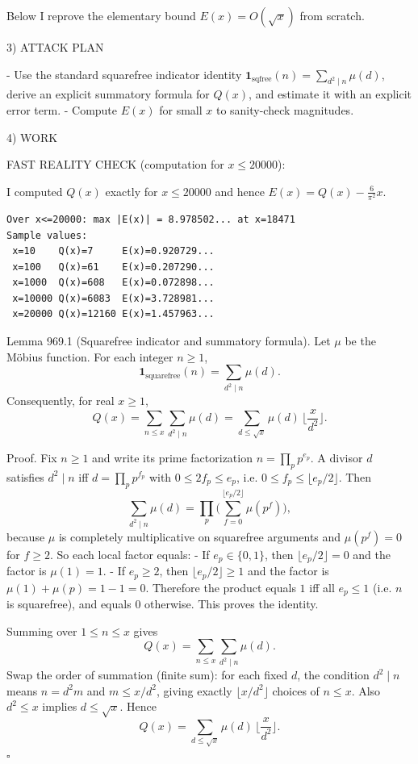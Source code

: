 Below I reprove the elementary bound $E(x)=O(\sqrt x)$ from scratch.

3) ATTACK PLAN

- Use the standard squarefree indicator identity $\mathbf 1_{\text{sqfree}}(n)=\sum_{d^2\mid n}\mu(d)$, derive an explicit summatory formula for $Q(x)$, and estimate it with an explicit error term.
- Compute $E(x)$ for small $x$ to sanity-check magnitudes.

4) WORK

FAST REALITY CHECK (computation for $x\le 20000$):

I computed $Q(x)$ exactly for $x\le 20000$ and hence $E(x)=Q(x)-\frac{6}{\pi^2}x$.

\begin{verbatim}
Over x<=20000: max |E(x)| = 8.978502... at x=18471
Sample values:
 x=10    Q(x)=7     E(x)=0.920729...
 x=100   Q(x)=61    E(x)=0.207290...
 x=1000  Q(x)=608   E(x)=0.072898...
 x=10000 Q(x)=6083  E(x)=3.728981...
 x=20000 Q(x)=12160 E(x)=1.457963...
\end{verbatim}

Lemma 969.1 (Squarefree indicator and summatory formula).
Let $\mu$ be the M\"obius function. For each integer $n\ge 1$,
\[
\mathbf 1_{\text{squarefree}}(n)=\sum_{d^2\mid n} \mu(d).
\]
Consequently, for real $x\ge 1$,
\[
Q(x)=\sum_{n\le x} \sum_{d^2\mid n}\mu(d) = \sum_{d\le \sqrt x} \mu(d)\,\Big\lfloor\frac{x}{d^2}\Big\rfloor.
\]

Proof.
Fix $n\ge 1$ and write its prime factorization $n=\prod_p p^{e_p}$.
A divisor $d$ satisfies $d^2\mid n$ iff $d=\prod_p p^{f_p}$ with $0\le 2f_p\le e_p$, i.e. $0\le f_p\le \lfloor e_p/2\rfloor$.
Then
\[
\sum_{d^2\mid n}\mu(d) = \prod_p \Big(\sum_{f=0}^{\lfloor e_p/2\rfloor} \mu(p^f)\Big),
\]
because $\mu$ is completely multiplicative on squarefree arguments and $\mu(p^f)=0$ for $f\ge 2$.
So each local factor equals:
- If $e_p\in\{0,1\}$, then $\lfloor e_p/2\rfloor=0$ and the factor is $\mu(1)=1$.
- If $e_p\ge 2$, then $\lfloor e_p/2\rfloor\ge 1$ and the factor is $\mu(1)+\mu(p)=1-1=0$.
Therefore the product equals $1$ iff all $e_p\le 1$ (i.e. $n$ is squarefree), and equals $0$ otherwise. This proves the identity.

Summing over $1\le n\le x$ gives
\[
Q(x)=\sum_{n\le x} \sum_{d^2\mid n} \mu(d).
\]
Swap the order of summation (finite sum): for each fixed $d$, the condition $d^2\mid n$ means $n=d^2 m$ and $m\le x/d^2$, giving exactly $\lfloor x/d^2\rfloor$ choices of $n\le x$. Also $d^2\le x$ implies $d\le \sqrt x$. Hence
\[
Q(x)=\sum_{d\le \sqrt x} \mu(d)\,\Big\lfloor \frac{x}{d^2}\Big\rfloor.
\]
$\square$

